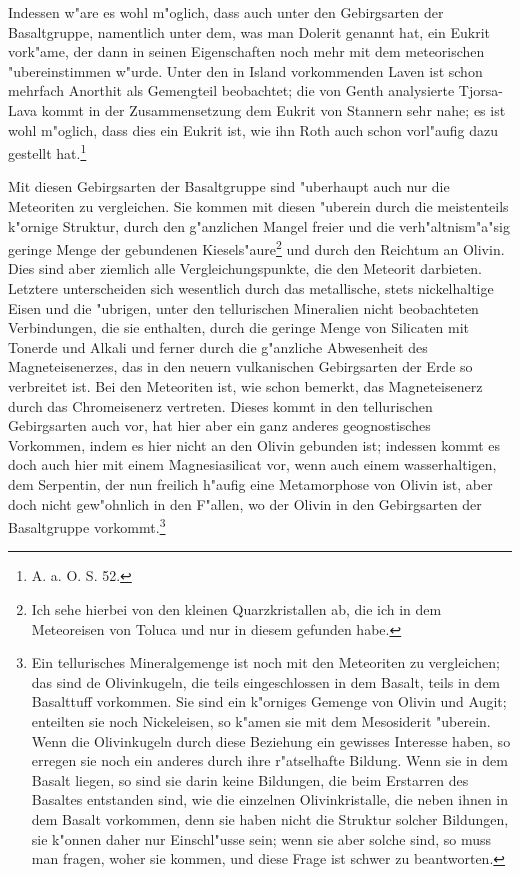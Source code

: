 \documentclass[a4paper, 11pt, oneside]{article}
\begin{document}
Indessen w"are es wohl m"oglich, dass auch unter den Gebirgsarten der Basaltgruppe, namentlich unter dem, was man Dolerit genannt hat, ein Eukrit vork"ame, der dann in seinen Eigenschaften noch mehr mit dem meteorischen "ubereinstimmen w"urde. Unter den in Island vorkommenden Laven ist schon mehrfach Anorthit als Gemengteil beobachtet; die von Genth analysierte Tjorsa-Lava kommt in der Zusammensetzung dem Eukrit von Stannern sehr nahe; es ist wohl m"oglich, dass dies ein Eukrit ist, wie ihn Roth auch schon vorl"aufig dazu gestellt hat.\footnote{A. a. O. S. 52.}

Mit diesen Gebirgsarten der Basaltgruppe sind "uberhaupt auch nur die Meteoriten zu vergleichen. Sie kommen mit diesen "uberein durch die meistenteils k"ornige Struktur, durch den g"anzlichen Mangel freier und die verh"altnism"a"sig geringe Menge der gebundenen Kiesels"aure\footnote{Ich sehe hierbei von den kleinen Quarzkristallen ab, die ich in dem Meteoreisen von Toluca und nur in diesem gefunden habe.} und durch den Reichtum an Olivin. Dies sind aber ziemlich alle Vergleichungspunkte, die den Meteorit darbieten. Letztere unterscheiden sich wesentlich durch das metallische, stets nickelhaltige Eisen und die "ubrigen, unter den tellurischen Mineralien nicht beobachteten Verbindungen, die sie enthalten, durch die geringe Menge von Silicaten mit Tonerde und Alkali und ferner durch die g"anzliche Abwesenheit des Magneteisenerzes, das in den neuern vulkanischen Gebirgsarten der Erde so verbreitet ist. Bei den Meteoriten ist, wie schon bemerkt, das Magneteisenerz durch das Chromeisenerz vertreten. Dieses kommt in den tellurischen Gebirgsarten auch vor, hat hier aber ein ganz anderes geognostisches Vorkommen, indem es hier nicht an den Olivin gebunden ist; indessen kommt es doch auch hier mit einem Magnesiasilicat vor, wenn auch einem wasserhaltigen, dem Serpentin, der nun freilich h"aufig eine Metamorphose von Olivin ist, aber doch nicht gew"ohnlich in den F"allen, wo der Olivin in den Gebirgsarten der Basaltgruppe vorkommt.\footnote{Ein tellurisches Mineralgemenge ist noch mit den Meteoriten zu vergleichen; das sind de Olivinkugeln, die teils eingeschlossen in dem Basalt, teils in dem Basalttuff vorkommen. Sie sind ein k"orniges Gemenge von Olivin und Augit; enteilten sie noch Nickeleisen, so k"amen sie mit dem Mesosiderit "uberein. Wenn die Olivinkugeln durch diese Beziehung ein gewisses Interesse haben, so erregen sie noch ein anderes durch ihre r"atselhafte Bildung. Wenn sie in dem Basalt liegen, so sind sie darin keine Bildungen, die beim Erstarren des Basaltes entstanden sind, wie die einzelnen Olivinkristalle, die neben ihnen in dem Basalt vorkommen, denn sie haben nicht die Struktur solcher Bildungen, sie k"onnen daher nur Einschl"usse sein; wenn sie aber solche sind, so muss man fragen, woher sie kommen, und diese Frage ist schwer zu beantworten.}
\end{document}
